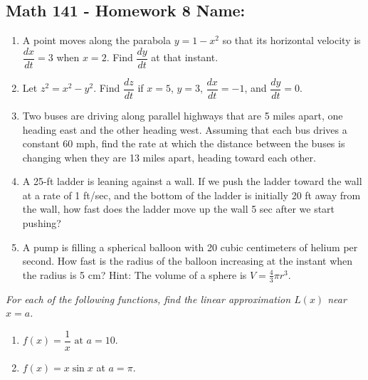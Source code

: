 \documentclass[11pt]{article}
\begin{document}
\pagestyle{empty}
\subsection*{Math 141 - Homework 8 \hfill Name: \underline{\hspace*{2in}}}

\begin{enumerate}
\item A point moves along the parabola $y = 1 - x^2$ so that its horizontal velocity is $\dfrac{dx}{dt} = 3$ when $x = 2$.  Find $\dfrac{dy}{dt}$ at that instant. 
\vfill

\item Let $z^2 = x^2 - y^2$. Find $\dfrac{dz}{dt}$ if $x = 5$, $y = 3$, $\dfrac{dx}{dt} = -1$, and $\dfrac{dy}{dt} = 0$.  
\vfill


\item Two buses are driving along parallel highways that are 5 miles apart, one heading east and the other heading west. Assuming that each bus drives a constant 60 mph, find the rate at which the distance between the buses is changing when they are 13 miles apart, heading toward each other. 
\vfill
\vfill

\item A 25-ft ladder is leaning against a wall. If we push the ladder toward the wall at a rate of 1 ft/sec, and the bottom of the ladder is initially 20 ft away from the wall, how fast does the ladder move up the wall 5 sec after we start pushing?
\vfill
\vfill

\item A pump is filling a spherical balloon with 20 cubic centimeters of helium per second.  How fast is the radius of the balloon increasing at the instant when the radius is 5 cm? Hint: The volume of a sphere is $V = \tfrac{4}{3} \pi r^3$.
\vfill

\newpage
\setcounter{enumCount}{\theenumi}
\end{enumerate}

\noindent
\textit{For each of the following functions, find the linear approximation $L(x)$ near $x = a$.}
\noindent
\begin{multicols}{2}
\begin{enumerate}
\setcounter{enumi}{\theenumCount}
\item $f(x) = \dfrac{1}{x} \text{ at } a = 10.$
\item $f(x) = x \sin x$ at $a = \pi$.
\setcounter{enumCount}{\theenumi}
\end{enumerate}
\end{multicols}
\vfill
\end{document}

